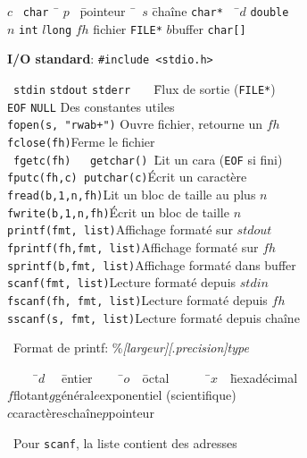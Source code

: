 \documentclass[a4paper,10pt,landscape]{article}
\begin{document}
\begin{minipage}{1.0\linewidth}
\begin{multicols}{3}
  \vspace{-\baselineskip}  
  \begin{tabbing}
    $c$~ \=\verb=char = \= $p$~ \=pointeur~ \=~$s$ \=chaîne \verb=char*=~~ \=$d$ \=\verb=double=\\
    $n$ \> \verb=int= \>$l$\>\verb=long= \>$\!\!$$fh$ \>fichier \verb=FILE*= \>$b$\>buffer \verb=char[]=
  \end{tabbing}
  \vspace{-\baselineskip}

  \textbf{I/O standard}: \verb=#include <stdio.h>=\vspace{-.7\baselineskip}
  \begin{tabbing}
    ~\=\verb=stdin= \=\verb=stdout= \=\verb=stderr   =   \=Flux de sortie (\verb=FILE*=)\\
    \>\verb=EOF= \>\verb=NULL= \>\>Des constantes utiles\\
    \>\verb=fopen(s, "rwab+")= \>\>\>Ouvre fichier, retourne un $fh$\\
    \>\verb=fclose(fh)=\>\>\>Ferme le fichier\\
    \pushtabs
    ~\=\verb=fgetc(fh)   getchar() =\=Lit un cara (\verb=EOF= si fini)\\
    \>\verb=fputc(fh,c) putchar(c)=\>Écrit un caractère\\
    \>\verb=fread(b,1,n,fh)=\>Lit un bloc de taille au plus $n$\\
    \>\verb=fwrite(b,1,n,fh)=\>Écrit un bloc de taille $n$\\
    \>\verb=printf(fmt, list)=\>Affichage formaté sur $stdout$\\
    \>\verb=fprintf(fh,fmt, list)=\>Affichage formaté sur $fh$\\
    \>\verb=sprintf(b,fmt, list)=\>Affichage formaté dans buffer\\
    \>\verb=scanf(fmt, list)=\>Lecture formaté depuis $stdin$\\
    \>\verb=fscanf(fh, fmt, list)=\>Lecture formaté depuis $fh$\\
    \>\verb=sscanf(s, fmt, list)=\>Lecture formaté depuis chaîne
    \poptabs
  \end{tabbing}
  \vspace{-.8\baselineskip}
  ~Format de printf: \%\textit{[largeur][}.\textit{precision]}\textit{type}
  \vspace{-.8\baselineskip}
  \begin{tabbing}
    ~~~~~\=$d$~~ \=entier~~~~~\=$o$~~\=octal~~~~~~ \=$x$~~\=hexadécimal\\
    \>$f$\>flotant\>$g$\>général\>$e$\>exponentiel (scientifique)\\
    \>$c$\>caractère\>$s$\>chaîne\>$p$\>pointeur
  \end{tabbing}
  \vspace{-.8\baselineskip}
  ~Pour \verb=scanf=, la liste contient des adresses


\end{multicols}
\end{minipage}
\end{document}
